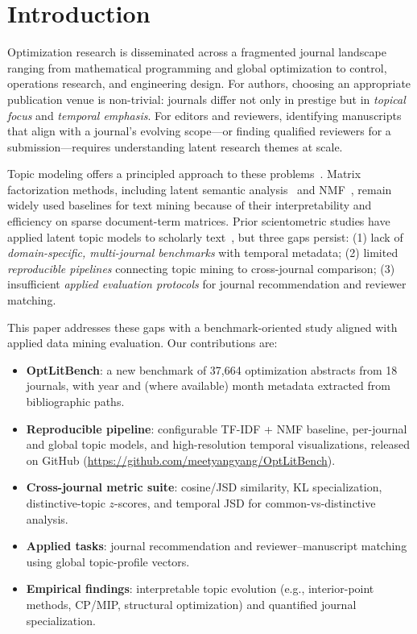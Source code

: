 \documentclass[conference]{IEEEtran}
\newcommand{\repo}{\url{https://github.com/meetyangyang/OptLitBench}}
\begin{document}
\section{Introduction}
\label{sec:intro}

Optimization research is disseminated across a fragmented journal landscape ranging from mathematical programming and global optimization to control, operations research, and engineering design.
For authors, choosing an appropriate publication venue is non-trivial: journals differ not only in prestige but in \emph{topical focus} and \emph{temporal emphasis}.
For editors and reviewers, identifying manuscripts that align with a journal's evolving scope---or finding qualified reviewers for a submission---requires understanding latent research themes at scale.

Topic modeling offers a principled approach to these problems~\cite{blei2003lda,hofmann1999plsa,lee1999nmf}.
Matrix factorization methods, including latent semantic analysis~\cite{deerwester1990lsa} and NMF~\cite{lee2001nmf}, remain widely used baselines for text mining because of their interpretability and efficiency on sparse document-term matrices.
Prior scientometric studies have applied latent topic models to scholarly text~\cite{silva2016scientometrics,wang2019scholarly,endres2022topic}, but three gaps persist:
(1) lack of \emph{domain-specific, multi-journal benchmarks} with temporal metadata;
(2) limited \emph{reproducible pipelines} connecting topic mining to cross-journal comparison;
(3) insufficient \emph{applied evaluation protocols} for journal recommendation and reviewer matching.

This paper addresses these gaps with a benchmark-oriented study aligned with applied data mining evaluation.
Our contributions are:
\begin{itemize}
  \item \textbf{OptLitBench}: a new benchmark of 37,664 optimization abstracts from 18 journals, with year and (where available) month metadata extracted from bibliographic paths.
  \item \textbf{Reproducible pipeline}: configurable TF-IDF + NMF baseline, per-journal and global topic models, and high-resolution temporal visualizations, released on GitHub (\repo{}).
  \item \textbf{Cross-journal metric suite}: cosine/JSD similarity, KL specialization, distinctive-topic $z$-scores, and temporal JSD for common-vs-distinctive analysis.
  \item \textbf{Applied tasks}: journal recommendation and reviewer--manuscript matching using global topic-profile vectors.
  \item \textbf{Empirical findings}: interpretable topic evolution (e.g., interior-point methods, CP/MIP, structural optimization) and quantified journal specialization.
\end{itemize}
\end{document}
